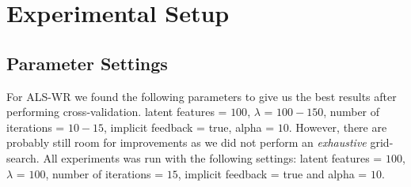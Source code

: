 
\section{Experimental Setup}

\subsection{Parameter Settings}

For ALS-WR we found the following parameters to give us the best results after performing cross-validation.
latent features = $100$, $\lambda$ = $100-150$, number of iterations = $10-15$, implicit feedback = true, alpha = $10$.
However, there are probably still room for improvements as we did not perform an \emph{exhaustive} grid-search.
All experiments was run with the following settings: latent features = $100$, $\lambda$ = $100$, number of iterations = $15$,
implicit feedback = true and alpha = $10$.
